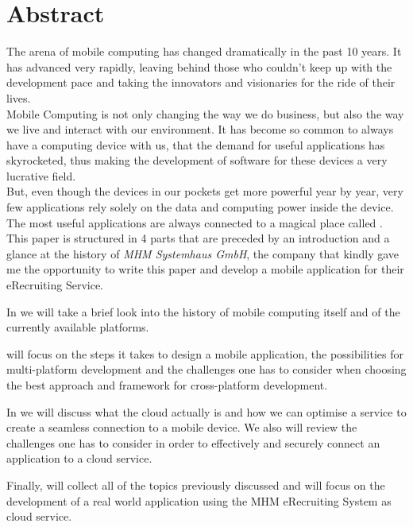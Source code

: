 \begingroup
\let\clearpage\relax
\let\cleardoublepage\relax
\let\cleardoublepage\relax
\vfill
\chapter*{Abstract}
The arena of mobile computing has changed dramatically in the past 10 years. It has advanced very rapidly, leaving behind those who couldn't keep up with the development pace and taking the innovators and visionaries for the ride of their lives.\\
\newline
Mobile Computing is not only changing the way we do business, but also the way we live and interact with our environment. It has become so common to always have a computing device with us, that the demand for useful applications has skyrocketed, thus making the development of software for these devices a very lucrative field.\\
\newline
But,  even though the devices in our pockets get more powerful year by year, very few applications rely solely on the data and computing power inside the device. The most useful applications are always connected to a magical place called .\\
\newline
This paper is structured in 4 parts that are preceded by an introduction and a glance at the history of \emph{MHM Systemhaus GmbH}, the company that kindly gave me the opportunity to write this paper and develop a mobile application for their eRecruiting Service.

In  we will take a brief look into the history of mobile computing itself and of the currently available platforms. 

 will focus on the steps it takes to design a mobile application, the possibilities for multi-platform development and the challenges one has to consider when choosing the best approach and framework for cross-platform development.

In  we will discuss what the cloud actually is and how we can optimise a service to create a seamless connection to a mobile device. We also will review the challenges one has to consider in order to effectively and securely connect an application to a cloud service.

Finally,  will collect all of the topics previously discussed and will focus on the development of a real world application using the MHM eRecruiting System as cloud service.       


\vfill


\endgroup			

\vfill